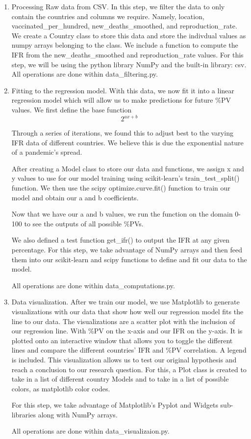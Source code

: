 \documentclass[fontsize=11pt]{article}
\begin{document}
  
\begin{enumerate}
    \item Processing Raw data from CSV. In this step, we filter the data to only contain the countries and columns we require. Namely, location, vaccinated\_per\_hundred, new\_deaths\_smoothed, and reproduction\_rate. We create a Country class to store this data and store the indivdual values as numpy arrays belonging to the class. We include a function to compute the IFR from the new\_deaths\_smoothed and reproduction\_rate values.  
    For this step, we will be using the python library NumPy and the built-in library: csv. All operations are done within data\_filtering.py.
      
    \item Fitting to the regression model. With this data, we now fit it into a linear regression model which will allow us to make predictions for future \%PV values. We first define the base function
        \[
            2^{ax + b}
        \]
        
        
    Through a series of iterations, we found this to adjust best to the varying IFR data of different countries. We believe this is due the exponential nature of a pandemic's spread. 


    After creating a Model class to store our data and functions, we assign x and y values to use for our model training using scikit-learn's train\_test\_split() function. We then use the scipy optimize.curve.fit() function to train our model and obtain our a and b coefficients.

    Now that we have our a and b values, we run the function on the domain 0-100 to see the outputs of all possible \%PVs.


    We also defined a test function get\_ifr() to output the IFR at any given percentage.
    For this step, we take advantage of NumPy arrays and then feed them into our scikit-learn and scipy functions to define and fit our data to the model.   

    
    All operations are done within data\_computations.py.
      
\item Data visualization. After we train our model, we use Matplotlib to generate visualizations with our data that show how well our regression model fits the line to our data. The visualizations are a scatter plot with the inclusion of our regression line. With \%PV on the x-axis and our IFR on the y-axis. It is plotted onto an interactive window that allows you to toggle the different lines and compare the different countries' IFR and \%PV correlation. A legend is included. This visualization allows us to test our original hypothesis and reach a conclusion to our research question. For this, a Plot class is created to take in a list of different country Models and to take in a list of possible colors, as matplotlib color codes.

    For this step, we take advantage of Matplotlib's Pyplot and Widgets sub-libraries along with NumPy arrays. 

    All operations are done within data\_visualizaion.py.
  
\end{enumerate}  
  
\end{document}
